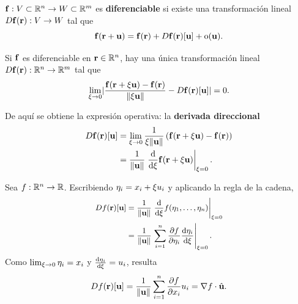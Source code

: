 \begin{definicion}[Diferenciabilidad]
  \label{def:diferenciabilidad}
  $\mathbf{f}:V\subset\mathbb{R}^n\rightarrow W\subset\mathbb{R}^m$ es \textbf{diferenciable} si
  existe una transformaci\'on lineal $D\mathbf{f}(\mathbf{r}):V\rightarrow W$ tal que
  \begin{equation}
    \label{eq:diferenciabilidad}
    \mathbf{f}(\mathbf{r}+\mathbf{u})
      =\mathbf{f}(\mathbf{r})+D\mathbf{f}(\mathbf{r})[\mathbf{u}]+\mathrm{o}(\mathbf{u}).
  \end{equation}
\end{definicion}

\begin{teorema}
  \label{teo:unicidad_diferencial}
  Si $\mathbf{f}$ es diferenciable en $\mathbf{r}\in\mathbb{R}^n$, hay una \'unica
  transformaci\'on lineal $D\mathbf{f}(\mathbf{r}):\mathbb{R}^n\rightarrow\mathbb{R}^m$ tal que
  \begin{equation}
    \label{eq:unicidad_diferencial}
    \lim_{\xi\rightarrow 0}
      \lvert \frac{\mathbf{f}(\mathbf{r}+\xi\mathbf{u})-\mathbf{f}(\mathbf{r})}
                {\lVert \xi\mathbf{u} \rVert}-D\mathbf{f}(\mathbf{r})[\mathbf{u}] \rvert=0 .
  \end{equation}
\end{teorema}

De aqu\'i se obtiene la expresi\'on operativa: la \textbf{derivada
direccional}
\begin{equation}
  \label{eq:derivada_direccional}
  \begin{aligned}
    D\mathbf{f}(\mathbf{r})[\mathbf{u}]
      &=\lim_{\xi\rightarrow 0}\frac{1}{\xi\lVert \mathbf{u} \rVert}
        \left( \mathbf{f}(\mathbf{r}+\xi\mathbf{u})-\mathbf{f}(\mathbf{r}) \right)\\
      &=\frac{1}{\lVert \mathbf{u} \rVert}
        \left. \frac{\mathrm{d}}{\mathrm{d}\xi}\mathbf{f}(\mathbf{r}+\xi\mathbf{u}) \right|_{\xi=0}.
  \end{aligned}
\end{equation}

\begin{ejemplo}
  \label{ej:gradiente_escalar}
  Sea $f:\mathbb{R}^n\rightarrow\mathbb{R}$. Escribiendo
  $\eta_i=x_i+\xi u_i$ y aplicando la regla de la cadena,
  \begin{equation}
    \label{eq:derivada_direccional_escalar}
    \small
    \begin{aligned}
      Df(\mathbf{r})[\mathbf{u}]
        &=\frac{1}{\lVert \mathbf{u} \rVert}
          \left. \frac{\mathrm{d}}{\mathrm{d}\xi}f(\eta_1,\dots,\eta_n) \right|_{\xi=0}\\
        &=\frac{1}{\lVert \mathbf{u} \rVert}
          \left. \sum_{i=1}^{n}\frac{\partial f}{\partial \eta_i}\frac{\mathrm{d}\eta_i}{\mathrm{d}\xi} \right|_{\xi=0}.
    \end{aligned}
  \end{equation}
  Como $\lim_{\xi\rightarrow 0}\eta_i=x_i$ y
  $\frac{\mathrm{d}\eta_i}{\mathrm{d}\xi}=u_i$, resulta
  \begin{equation}
    \label{eq:gradiente_producto}
    Df(\mathbf{r})[\mathbf{u}]=\frac{1}{\lVert \mathbf{u} \rVert}
      \sum_{i=1}^{n}\frac{\partial f}{\partial x_i}u_i
      =\nabla f\cdot\hat{\mathbf{u}}.
  \end{equation}
\end{ejemplo}

